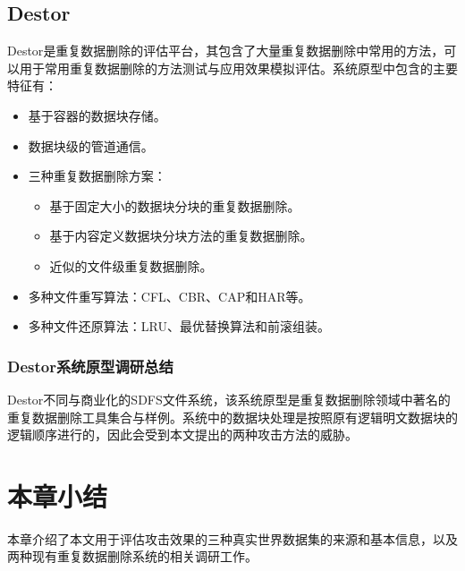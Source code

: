 \subsection{Destor}

Destor\cite{fu2015design}是重复数据删除的评估平台，其包含了大量重复数据删除中常用的方法，可以用于常用重复数据删除的方法测试与应用效果模拟评估。系统原型中包含的主要特征有：

\begin{itemize}
    \item 基于容器的数据块存储。
    \item 数据块级的管道通信。
    \item 三种重复数据删除方案：
    \begin{itemize}
        \item 基于固定大小的数据块分块的重复数据删除。
        \item 基于内容定义数据块分块方法的重复数据删除。
        \item 近似的文件级重复数据删除。
    \end{itemize}
    \item 多种文件重写算法：CFL、CBR、CAP和HAR等。
    \item 多种文件还原算法：LRU、最优替换算法和前滚组装。
\end{itemize}

\subsubsection{Destor系统原型调研总结}

Destor不同与商业化的SDFS文件系统，该系统原型是重复数据删除领域中著名的重复数据删除工具集合与样例。系统中的数据块处理是按照原有逻辑明文数据块的逻辑顺序进行的，因此会受到本文提出的两种攻击方法的威胁。

\section{本章小结}
本章介绍了本文用于评估攻击效果的三种真实世界数据集的来源和基本信息，以及两种现有重复数据删除系统的相关调研工作。
